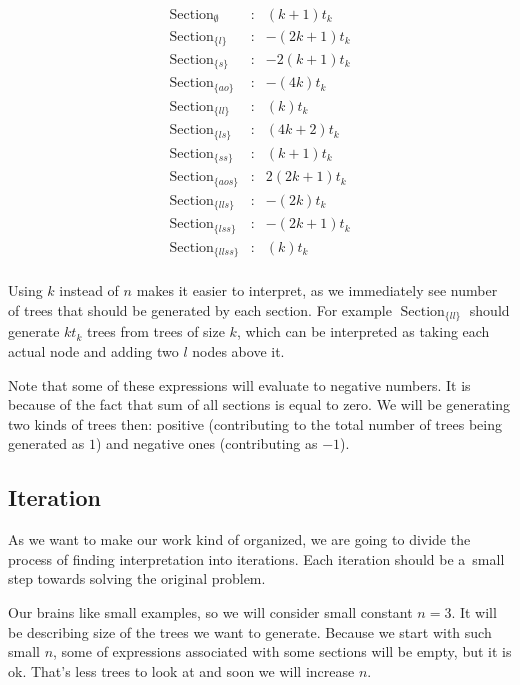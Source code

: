 \documentclass[final]{article}
\theoremstyle{definition}
\theoremstyle{definition}
\theoremstyle{remark}
\DeclareMathOperator{\tSection}{\text{Section}}
\begin{document}
\[\begin{array}{lcr}
        \tSection_{\emptyset} &:& (k + 1) t_k\\
        \tSection_{\{l\}} &:& - (2 k + 1) t_k\\
        \tSection_{\{s\}} &:& - 2 (k + 1) t_k\\
        \tSection_{\{ao\}} &:& - (4 k) t_k\\
        \tSection_{\{ll\}} &:& (k) t_k\\
        \tSection_{\{ls\}} &:& (4 k + 2) t_k\\
        \tSection_{\{ss\}} &:& (k + 1) t_k\\
        \tSection_{\{aos\}} &:& 2 (2 k + 1) t_k\\
        \tSection_{\{lls\}} &:& - (2 k) t_k\\
        \tSection_{\{lss\}} &:& - (2 k + 1) t_k\\
        \tSection_{\{llss\}} &:& (k) t_k\\
\end{array}\]

Using \(k\) instead of \(n\) makes it easier to interpret, as we immediately see number of trees that should be generated by each section. For example \(\tSection_{\{ll\}}\) should generate \(k t_k\) trees from trees of size \(k\), which can be interpreted as taking each actual node and adding two \(l\) nodes above it.

Note that some of these expressions will evaluate to negative numbers. It is because of the fact that sum of all sections is equal to zero. We will be generating two kinds of trees then: positive (contributing to the total number of trees being generated as \(1\)) and negative ones (contributing as \(-1\)).

\subsection{Iteration}%
\label{sub:iteration}

As we want to make our work kind of organized, we are going to divide the process of finding interpretation into iterations. Each iteration should be a~small step towards solving the original problem.

Our brains like small examples, so we will consider small constant \(n = 3\). It will be describing size of the trees we want to generate. Because we start with such small \(n\), some of expressions associated with some sections will be empty, but it is ok. That's less trees to look at and soon we will increase \(n\).
\end{document}
